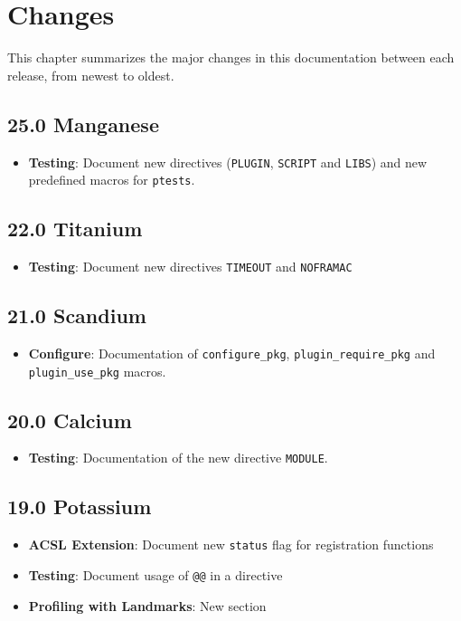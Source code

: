 
\chapter{Changes}\label{chap:changes}

This chapter summarizes the major changes in this documentation between each
\framac release, from newest to oldest.

\section*{25.0 Manganese}
\begin{itemize}
\item \textbf{Testing}: Document new directives (\texttt{PLUGIN}, \texttt{SCRIPT} and \texttt{LIBS}) and new predefined macros for \texttt{ptests}.
\end{itemize}

\section*{22.0 Titanium}
\begin{itemize}
\item \textbf{Testing}: Document new directives \texttt{TIMEOUT} and
\texttt{NOFRAMAC}
\end{itemize}

\section*{21.0 Scandium}
\begin{itemize}
\item \textbf{Configure}: Documentation of \texttt{configure\_pkg},
\texttt{plugin\_require\_pkg} and \texttt{plugin\_use\_pkg} macros.
\end{itemize}

\section*{20.0 Calcium}
\begin{itemize}
\item \textbf{Testing}: Documentation of the new directive \texttt{MODULE}.
\end{itemize}

\section*{19.0 Potassium}
\begin{itemize}
\item \textbf{ACSL Extension}: Document new \texttt{status} flag for registration functions
\item \textbf{Testing}: Document usage of \texttt{@@} in a directive
\item \textbf{Profiling with Landmarks}: New section
\end{itemize}

